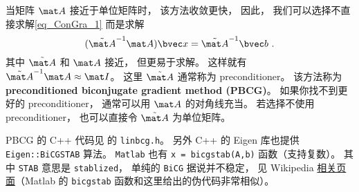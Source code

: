 当矩阵 $\mat A$ 接近于单位矩阵时， 该方法收敛更快， 因此， 我们可以选择不直接求解\autoref{eq_ConGra_1} 而是求解
\begin{equation}
(\tilde {\mat A}^{-1}\mat A) \bvec x = \tilde {\mat A}^{-1}\bvec b~.
\end{equation}
其中 $\tilde {\mat A}$ 和 $\mat A$ 接近， 但更易于求解。 这样就有 $\tilde {\mat A}^{-1}\mat A \approx \mat I$。 这里 $\tilde {\mat A}$ 通常称为 preconditioner。 该方法称为 \textbf{preconditioned biconjugate gradient method (PBCG)}。 如果你找不到更好的 preconditioner， 通常可以用 $\mat A$ 的对角线充当。 若选择不使用 preconditioner， 也可以直接令 $\tilde {\mat A}$ 为单位矩阵。

PBCG 的 C++ 代码见 \cite{NR3} 的 \verb|linbcg.h|。 另外 C++ 的 Eigen 库也提供 \verb|Eigen::BiCGSTAB| 算法。 \verb|Matlab| 也有 \verb|x = bicgstab(A,b)| 函数（支持复数）。 其中 \verb|STAB| 意思是 \verb|stablized|， 单纯的 \verb|BiCG| 据说并不稳定， 见 Wikipedia \href{https://en.wikipedia.org/wiki/Biconjugate_gradient_stabilized_method}{相关页面}（Matlab 的 \verb|bicgstab| 函数和这里给出的伪代码非常相似）。
